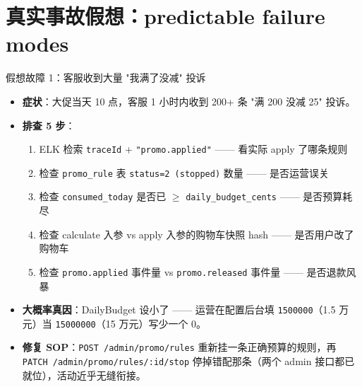 \documentclass[aspectratio=169,11pt]{beamer}
\begin{document}
\section{真实事故假想：predictable failure modes}

\begin{frame}[shrink]{假想故障 1：客服收到大量 "我满了没减" 投诉}
\begin{itemize}
  \item \textbf{症状}：大促当天 10 点，客服 1 小时内收到 200+ 条 "满 200 没减 25" 投诉。
  \item \textbf{排查 5 步}：
  \begin{enumerate}
    \item ELK 检索 \texttt{traceId} + \texttt{"promo.applied"} —— 看实际 apply 了哪条规则
    \item 检查 \texttt{promo\_rule} 表 \texttt{status=2 (stopped)} 数量 —— 是否运营误关
    \item 检查 \texttt{consumed\_today} 是否已 $\geq$ \texttt{daily\_budget\_cents} —— 是否预算耗尽
    \item 检查 calculate 入参 vs apply 入参的购物车快照 hash —— 是否用户改了购物车
    \item 检查 \texttt{promo.applied} 事件量 vs \texttt{promo.released} 事件量 —— 是否退款风暴
  \end{enumerate}
  \item \textbf{大概率真因}：DailyBudget 设小了 —— 运营在配置后台填 \texttt{1500000}（1.5 万元）当 \texttt{15000000}（15 万元）写少一个 0。
  \item \textbf{修复 SOP}：\texttt{POST /admin/promo/rules} 重新挂一条正确预算的规则，再 \texttt{PATCH /admin/promo/rules/:id/stop} 停掉错配那条（两个 admin 接口都已就位），活动近乎无缝衔接。
\end{itemize}
\end{frame}
\end{document}
